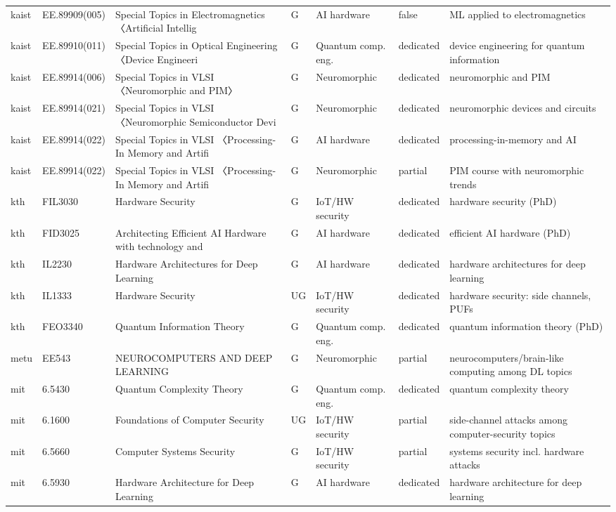 \documentclass[10pt]{article}
\begin{document}
\begin{longtable}{@{}llL{4.6cm}llll@{}}
kaist & EE.89909(005) & Special Topics in Electromagnetics 〈Artificial Intellig & G & AI hardware & false & ML applied to electromagnetics \\
kaist & EE.89910(011) & Special Topics in Optical Engineering 〈Device Engineeri & G & Quantum comp. eng. & dedicated & device engineering for quantum information \\
kaist & EE.89914(006) & Special Topics in VLSI 〈Neuromorphic and PIM〉 & G & Neuromorphic & dedicated & neuromorphic and PIM \\
kaist & EE.89914(021) & Special Topics in VLSI 〈Neuromorphic Semiconductor Devi & G & Neuromorphic & dedicated & neuromorphic devices and circuits \\
kaist & EE.89914(022) & Special Topics in VLSI 〈Processing-In Memory and Artifi & G & AI hardware & dedicated & processing-in-memory and AI \\
kaist & EE.89914(022) & Special Topics in VLSI 〈Processing-In Memory and Artifi & G & Neuromorphic & partial & PIM course with neuromorphic trends \\
kth & FIL3030 & Hardware Security & G & IoT/HW security & dedicated & hardware security (PhD) \\
kth & FID3025 & Architecting Efficient AI Hardware with technology and  & G & AI hardware & dedicated & efficient AI hardware (PhD) \\
kth & IL2230 & Hardware Architectures for Deep Learning & G & AI hardware & dedicated & hardware architectures for deep learning \\
kth & IL1333 & Hardware Security & UG & IoT/HW security & dedicated & hardware security: side channels, PUFs \\
kth & FEO3340 & Quantum Information Theory & G & Quantum comp. eng. & dedicated & quantum information theory (PhD) \\
metu & EE543 & NEUROCOMPUTERS AND DEEP LEARNING & G & Neuromorphic & partial & neurocomputers/brain-like computing among DL topics \\
mit & 6.5430 & Quantum Complexity Theory & G & Quantum comp. eng. & dedicated & quantum complexity theory \\
mit & 6.1600 & Foundations of Computer Security & UG & IoT/HW security & partial & side-channel attacks among computer-security topics \\
mit & 6.5660 & Computer Systems Security & G & IoT/HW security & partial & systems security incl. hardware attacks \\
mit & 6.5930 & Hardware Architecture for Deep Learning & G & AI hardware & dedicated & hardware architecture for deep learning \\

\end{longtable}
\end{document}
